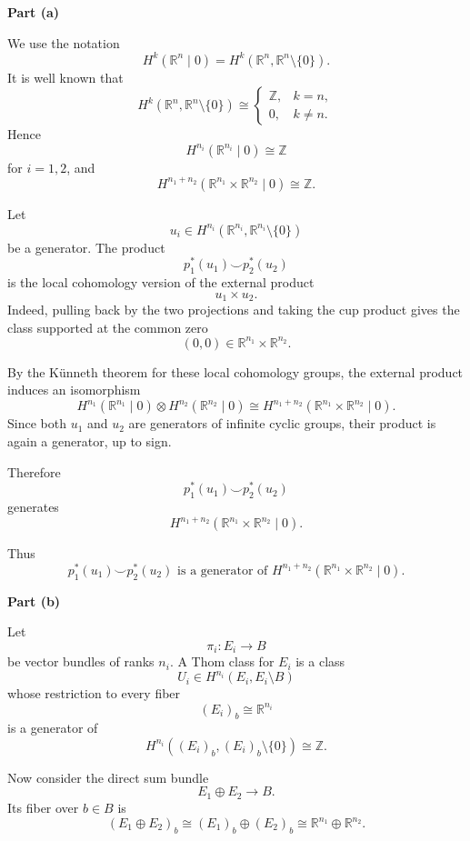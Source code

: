 \begin{solution}

\medskip
\noindent\textbf{Part (a)}\par
\smallskip


We use the notation
\[
H^k(\mathbb R^n\mid 0)
=
H^k(\mathbb R^n,\mathbb R^n\setminus\{0\}).
\]
It is well known that
\[
H^k(\mathbb R^n,\mathbb R^n\setminus\{0\})
\cong
\begin{cases}
	\mathbb Z, & k=n,\\
	0, & k\neq n.
\end{cases}
\]
Hence
\[
H^{n_i}(\mathbb R^{n_i}\mid 0)\cong \mathbb Z
\]
for \(i=1,2\), and
\[
H^{n_1+n_2}(\mathbb R^{n_1}\times \mathbb R^{n_2}\mid 0)\cong \mathbb Z.
\]

Let
\[
u_i\in H^{n_i}(\mathbb R^{n_i},\mathbb R^{n_i}\setminus\{0\})
\]
be a generator. The product
\[
p_1^*(u_1)\smile p_2^*(u_2)
\]
is the local cohomology version of the external product
\[
u_1\times u_2.
\]
Indeed, pulling back by the two projections and taking the cup product gives the
class supported at the common zero
\[
(0,0)\in \mathbb R^{n_1}\times \mathbb R^{n_2}.
\]

By the K\"unneth theorem for these local cohomology groups, the external product
induces an isomorphism
\[
H^{n_1}(\mathbb R^{n_1}\mid 0)
\otimes
H^{n_2}(\mathbb R^{n_2}\mid 0)
\cong
H^{n_1+n_2}(\mathbb R^{n_1}\times \mathbb R^{n_2}\mid 0).
\]
Since both \(u_1\) and \(u_2\) are generators of infinite cyclic groups, their
product is again a generator, up to sign.

Therefore
\[
p_1^*(u_1)\smile p_2^*(u_2)
\]
generates
\[
H^{n_1+n_2}(\mathbb R^{n_1}\times \mathbb R^{n_2}\mid 0).
\]

Thus
\[
\boxed{
	p_1^*(u_1)\smile p_2^*(u_2)
	\text{ is a generator of }
	H^{n_1+n_2}(\mathbb R^{n_1}\times \mathbb R^{n_2}\mid 0).
}
\]


\medskip
\noindent\textbf{Part (b)}\par
\smallskip


Let
\[
\pi_i:E_i\to B
\]
be vector bundles of ranks \(n_i\). A Thom class for \(E_i\) is a class
\[
U_i\in H^{n_i}(E_i,E_i\setminus B)
\]
whose restriction to every fiber
\[
(E_i)_b\cong \mathbb R^{n_i}
\]
is a generator of
\[
H^{n_i}((E_i)_b,(E_i)_b\setminus\{0\})
\cong \mathbb Z.
\]

Now consider the direct sum bundle
\[
E_1\oplus E_2\to B.
\]
Its fiber over \(b\in B\) is
\[
(E_1\oplus E_2)_b
\cong
(E_1)_b\oplus (E_2)_b
\cong
\mathbb R^{n_1}\oplus \mathbb R^{n_2}.
\]


\end{solution}
